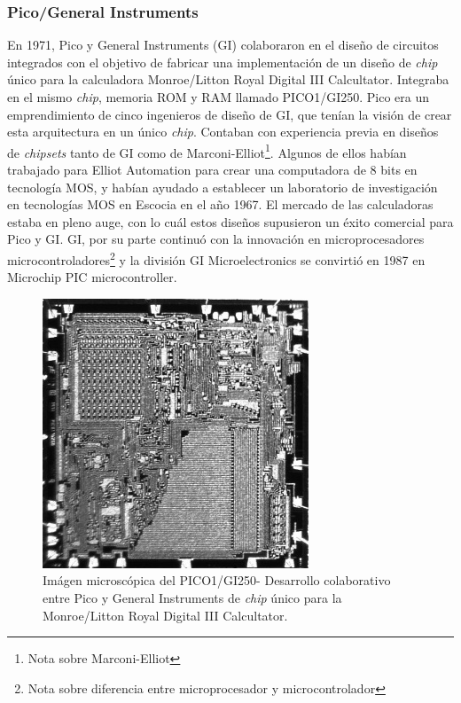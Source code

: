 \subsubsection{Pico/General Instruments}

En 1971, Pico y General Instruments (GI) colaboraron en el diseño de circuitos integrados con el objetivo de fabricar una implementación de un diseño de \emph{chip} único para la calculadora Monroe/Litton Royal Digital III Calcultator. Integraba en el mismo \emph{chip}, memoria ROM y RAM llamado PICO1/GI250. Pico era un emprendimiento de cinco ingenieros de diseño de GI, que tenían la visión de crear esta arquitectura en un único \emph{chip}. Contaban con experiencia previa en diseños de \emph{chipsets} tanto de GI como de Marconi-Elliot\footnote{Nota sobre Marconi-Elliot}. Algunos de ellos habían trabajado para Elliot Automation para crear una computadora de 8 bits en tecnología MOS, y habían ayudado a establecer un laboratorio de investigación en tecnologías MOS en Escocia en el año 1967. El mercado de las calculadoras estaba en pleno auge, con lo cuál estos diseños supusieron un éxito comercial para Pico y GI. GI, por su parte continuó con la innovación en microprocesadores microcontroladores\footnote{Nota sobre diferencia entre microprocesador y microcontrolador} y la división GI Microelectronics se convirtió en 1987 en Microchip PIC microcontroller.

\begin{figure}
  \centering
  \includegraphics[scale=0.5]{./figures/C02-pico1_gi250}
  \captionsetup{justification=centering}
  \caption{Imágen microscópica del PICO1/GI250- Desarrollo colaborativo entre Pico y General Instruments de \emph{chip} único para la Monroe/Litton Royal Digital III Calcultator.}
  \label{fig:C02-pico1_gi250}
\end{figure}

